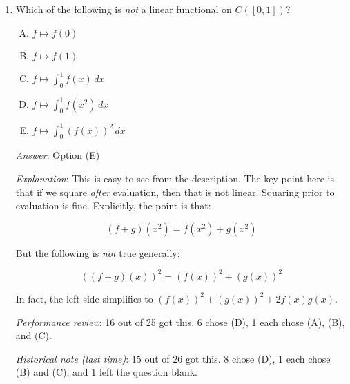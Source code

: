 \documentclass[10pt]{amsart}
\begin{document}
\begin{enumerate}
  {\em Answer}: Option (E)

  {\em Explanation}: {\em All} polynomials are infinitely
  differentiable, so they are all in $C^\infty(\R)$, the smallest of
  the spaces listed.

  {\em Performance review}: 4 out of 25 got this. 11 chose (D), 7
  chose (C), 2 chose (B), 1 left the question blank.

  {\em Historical note (last time)}: $7$ out of $26$ got this. $11$ chose (D),
  $6$ chose (C), $1$ chose (B), and $1$ left the question blank.

  \vspace{1in}

  Two more definitions of use. A {\em linear functional} on a vector
  space $V$ is a linear transformation from $V$ to $\R$, where $\R$ is
  viewed as a one-dimensional vector space over itself in the obvious way.

  We define $C([0,1])$ as the set of all continuous functions from
  $[0,1]$ to $\R$ with pointwise addition and scalar multiplication.

\item Which of the following is {\em not} a linear functional on
  $C([0,1])$?

  \begin{enumerate}[(A)]
  \item $f \mapsto f(0)$
  \item $f \mapsto f(1)$
  \item $f \mapsto \int_0^1 f(x) \, dx$
  \item $f \mapsto \int_0^1 f(x^2) \, dx$
  \item $f \mapsto \int_0^1 (f(x))^2 \, dx$
  \end{enumerate}

  {\em Answer}: Option (E)

  {\em Explanation}: This is easy to see from the description. The key
  point here is that if we square {\em after} evaluation, then that is
  not linear. Squaring prior to evaluation is fine. Explicitly, the
  point is that:

  $$(f + g)(x^2) = f(x^2) + g(x^2)$$

  But the following is {\em not} true generally:

  $$((f + g)(x))^2 = (f(x))^2 + (g(x))^2$$

  In fact, the left side simplifies to $(f(x))^2 + (g(x))^2 +
  2f(x)g(x)$.

  {\em Performance review}: 16 out of 25 got this. 6 chose (D), 1 each
  chose (A), (B), and (C).

  {\em Historical note (last time)}: $15$ out of $26$ got this. $8$
  chose (D), $1$ each chose (B) and (C), and $1$ left the question
  blank.
\end{enumerate}
\end{document}
